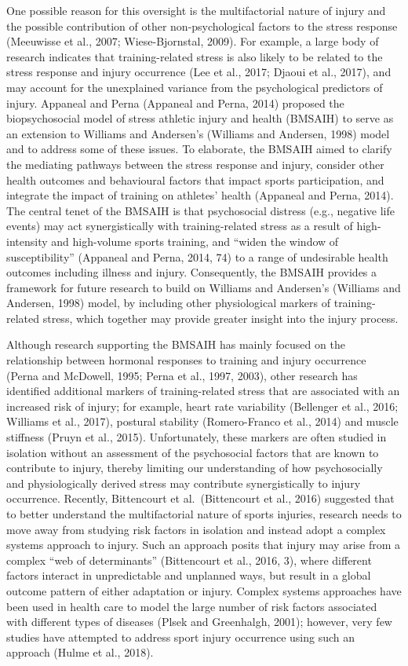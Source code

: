 \documentclass[utf8]{frontiersHLTH}
\begin{document}
One possible reason for this oversight is the multifactorial nature of
injury and the possible contribution of other non-psychological factors
to the stress response (Meeuwisse et al., 2007; Wiese-Bjornstal, 2009).
For example, a large body of research indicates that training-related
stress is also likely to be related to the stress response and injury
occurrence (Lee et al., 2017; Djaoui et al., 2017), and may account for
the unexplained variance from the psychological predictors of injury.
Appaneal and Perna (Appaneal and Perna, 2014) proposed the
biopsychosocial model of stress athletic injury and health (BMSAIH) to
serve as an extension to Williams and Andersen's (Williams and Andersen,
1998) model and to address some of these issues. To elaborate, the
BMSAIH aimed to clarify the mediating pathways between the stress
response and injury, consider other health outcomes and behavioural
factors that impact sports participation, and integrate the impact of
training on athletes' health (Appaneal and Perna, 2014). The central
tenet of the BMSAIH is that psychosocial distress (e.g., negative life
events) may act synergistically with training-related stress as a result
of high-intensity and high-volume sports training, and ``widen the
window of susceptibility'' (Appaneal and Perna, 2014, 74) to a range of
undesirable health outcomes including illness and injury. Consequently,
the BMSAIH provides a framework for future research to build on Williams
and Andersen's (Williams and Andersen, 1998) model, by including other
physiological markers of training-related stress, which together may
provide greater insight into the injury process.

Although research supporting the BMSAIH has mainly focused on the
relationship between hormonal responses to training and injury
occurrence (Perna and McDowell, 1995; Perna et al., 1997, 2003), other
research has identified additional markers of training-related stress
that are associated with an increased risk of injury; for example, heart
rate variability (Bellenger et al., 2016; Williams et al., 2017),
postural stability (Romero-Franco et al., 2014) and muscle stiffness
(Pruyn et al., 2015). Unfortunately, these markers are often studied in
isolation without an assessment of the psychosocial factors that are
known to contribute to injury, thereby limiting our understanding of how
psychosocially and physiologically derived stress may contribute
synergistically to injury occurrence. Recently, Bittencourt et
al.~(Bittencourt et al., 2016) suggested that to better understand the
multifactorial nature of sports injuries, research needs to move away
from studying risk factors in isolation and instead adopt a complex
systems approach to injury. Such an approach posits that injury may
arise from a complex ``web of determinants'' (Bittencourt et al., 2016,
3), where different factors interact in unpredictable and unplanned
ways, but result in a global outcome pattern of either adaptation or
injury. Complex systems approaches have been used in health care to
model the large number of risk factors associated with different types
of diseases (Plsek and Greenhalgh, 2001); however, very few studies have
attempted to address sport injury occurrence using such an approach
(Hulme et al., 2018).
\end{document}
